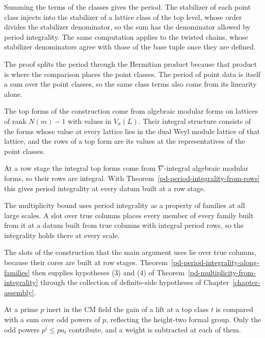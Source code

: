 Summing the terms of the classes gives the period. The stabilizer of each point class injects into
the stabilizer of a lattice class of the top level, whose order divides the stabilizer denominator,
so the sum has the denominator allowed by period integrality. The same computation applies to the
twisted chains, whose stabilizer denominators agree with those of the base tuple once they are
defined.

The proof splits the period through the Hermitian product because that product is where the
comparison places the point classes. The period of point data is itself a sum over the point
classes, so the same class terms also come from its linearity alone.

The top forms of the construction come from algebraic modular forms on lattices of rank $N(m)-1$
with values in $V_\sigma(L)$. Their integral structure consists of the forms whose value at every
lattice lies in the dual Weyl module lattice of that lattice, and the rows of a top form are its
values at the representatives of the point classes.

At a row stage the integral top forms come from $\nabla$-integral algebraic modular forms, so
their rows are integral. With Theorem~\ref{pd-period-integrality-from-rows} this gives period
integrality at every datum built at a row stage.

The multiplicity bound uses period integrality as a property of families at all large scales. A
slot over true columns places every member of every family built from it at a datum built from
true columns with integral period rows, so the integrality holds there at every scale.

The slots of the construction that the main argument uses lie over true columns, because their
cores are built at row stages. Theorem~\ref{pd-period-integrality-along-families} then supplies
hypotheses (3) and (4) of Theorem~\ref{pd-multiplicity-from-integrality} through the collection of
definite-side hypotheses of Chapter~\ref{chapter-assembly}.

At a prime $p$ inert in the CM field the gain of a lift at a top class $t$ is compared with a sum
over odd powers of $p$, reflecting the height-two formal group. Only the odd powers $p^i\leq pa_t$
contribute, and a weight is subtracted at each of them.

